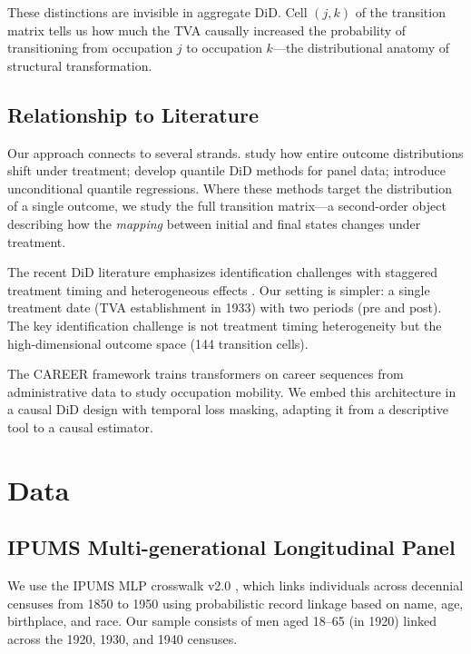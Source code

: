 \documentclass[12pt]{article}
\begin{document}
These distinctions are invisible in aggregate DiD. Cell $(j,k)$ of the transition matrix tells us how much the TVA causally increased the probability of transitioning from occupation $j$ to occupation $k$---the distributional anatomy of structural transformation.

\subsection{Relationship to Literature}

Our approach connects to several strands. \citet{athey2006} study how entire outcome distributions shift under treatment; \citet{callaway2019} develop quantile DiD methods for panel data; \citet{firpo2009} introduce unconditional quantile regressions. Where these methods target the distribution of a single outcome, we study the full transition matrix---a second-order object describing how the \textit{mapping} between initial and final states changes under treatment.

The recent DiD literature emphasizes identification challenges with staggered treatment timing and heterogeneous effects \citep{roth2023, callaway2021, dechaisemartin2020, borusyak2024, sunabraham2021}. Our setting is simpler: a single treatment date (TVA establishment in 1933) with two periods (pre and post). The key identification challenge is not treatment timing heterogeneity but the high-dimensional outcome space (144 transition cells).

The CAREER framework \citep{vafa2022} trains transformers on career sequences from administrative data to study occupation mobility. We embed this architecture in a causal DiD design with temporal loss masking, adapting it from a descriptive tool to a causal estimator.


\section{Data}
\label{sec:data}

\subsection{IPUMS Multi-generational Longitudinal Panel}

We use the IPUMS MLP crosswalk v2.0 \citep{abramitzky2021}, which links individuals across decennial censuses from 1850 to 1950 using probabilistic record linkage based on name, age, birthplace, and race. Our sample consists of men aged 18--65 (in 1920) linked across the 1920, 1930, and 1940 censuses.
\end{document}
